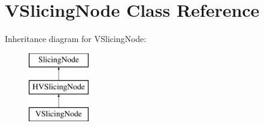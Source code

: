 \hypertarget{class_open_chams_1_1_v_slicing_node}{\section{V\-Slicing\-Node Class Reference}
\label{class_open_chams_1_1_v_slicing_node}
}
Inheritance diagram for V\-Slicing\-Node\-:\begin{figure}[H]
\begin{center}
\leavevmode
\includegraphics[height=3.000000cm]{class_open_chams_1_1_v_slicing_node}
\end{center}
\end{figure}
